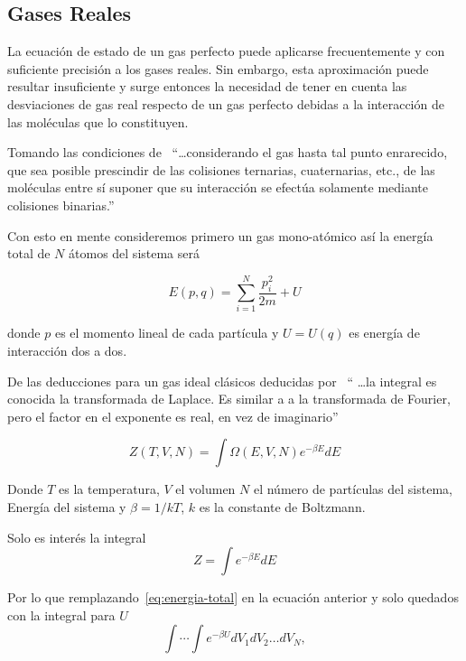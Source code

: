 \subsection{Gases Reales}
La ecuación de estado de un gas perfecto puede aplicarse
frecuentemente y con suficiente precisión a los gases reales. Sin embargo, esta aproximación
puede resultar insuficiente y surge entonces la necesidad de tener en cuenta las desviaciones de
gas real respecto de un gas perfecto debidas a la interacción de las moléculas que lo constituyen.
\parencite[p.~261]{landau}

Tomando las condiciones de~\parencite[p.~261]{landau} 
``\ldots considerando el gas hasta tal punto enrarecido, que sea posible prescindir de las colisiones ternarias, cuaternarias, etc.,
de las moléculas entre sí suponer que su interacción se efectúa solamente mediante colisiones binarias.''

Con esto en mente consideremos primero un gas mono-atómico así la energía total de $N$ átomos
del sistema será

\begin{equation}
    \label{eq:energia-total}
    E(p, q) = \sum_{i=1}^N \frac{p_i^2}{2m} + U
\end{equation}

donde $p$ es el momento lineal de cada partícula y $U = U(q)$ es energía
de interacción dos a dos.

De las deducciones para un gas ideal clásicos deducidas por~\parencite[p.~205, traducción propia]{Swendsen2012} ``
\ldots la integral es conocida la transformada de Laplace. Es similar a a la
transformada de Fourier, pero el factor en el exponente es real, en vez de imaginario''

\begin{equation}
    \label{eq:partition}
    Z(T, V, N) = \int \Omega(E, V, N) e^{-\beta E} dE
\end{equation}

Donde $T$ es la temperatura, $V$ el volumen $N$ el número de partículas del sistema, Energía
del sistema y $\beta = 1/kT$, $k$ es la constante de Boltzmann.

Solo es interés la integral
\begin{equation}
    Z = \int e^{-\beta E} dE
\end{equation}

Por lo que remplazando~\ref{eq:energia-total} en la ecuación anterior y
solo quedados con la integral para $U$
\begin{equation}
    \int \cdots \int e^{-\beta U} dV_1dV_2 \ldots dV_N,
\end{equation}

